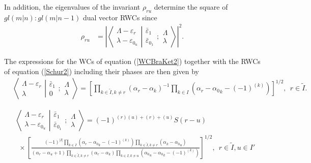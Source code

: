 \documentclass[12pt]{article}
\def\nn{\nonumber}
\begin{document}
In addition, the eigenvalues of the invariant ${\rho}_{ru}$ determine the square of $gl(m|n):gl(m|n-1)$ dual vector RWCs \cite{GIW2} since
\begin{align}
\rho_{ru} &= \left| \left\langle\left. 
\begin{array}{c} \Lambda-\varepsilon_r\\ \lambda-\varepsilon_{0_u} \end{array}
\right|\right.
\left.
\begin{array}{c} \bar{\varepsilon}_1 \\
\bar{\varepsilon}_{0_1}  \end{array}  ; \begin{array}{c} \Lambda \\
\lambda \end{array}
\right\rangle \nn \right|^2.
\end{align}

The expressions for the WCs of equation (\ref{WCBraKet2}) together with the RWCs of equation (\ref{Schur2}) including their phases \cite{GIW3} are then given by
\begin{align}
&\left\langle\left. 
\begin{array}{c} \Lambda-\varepsilon_r\\ \lambda
 \end{array}
\right|\right.
\left.
\begin{array}{c} \bar{\varepsilon}_1 \\ 0 
 \end{array}
; \begin{array}{c} \Lambda \\ \lambda
 \end{array}
\right\rangle
= \left[ \prod_{k\in \tilde{I},k\neq r} \left(\alpha_r - \alpha_k \right)^{-1}\prod_{k\in
I} \left(\alpha_r - {\alpha_0}_k - (-1)^{(k)}\right) \right]^{1/2}
,\ \ r\in \tilde{I} .
\end{align}

\begin{align}
&\left\langle\left. 
\begin{array}{c} \Lambda-\varepsilon_r\\ \lambda-\varepsilon_{0_u} 
 \end{array}
\right|\right.
\left.
\begin{array}{c} \bar{\varepsilon}_1 \\ \bar{\varepsilon}_{0_1} 
 \end{array}
; \begin{array}{c} \Lambda \\ \lambda
 \end{array}
\right\rangle
= (-1)^{(r)(u) +(r) + (u)} S(r-u)
\nn \\
&~~\times
\left[
\frac{
(-1)^{|I|}
\prod_{k\in I} \left(\alpha_r - {\alpha_0}_k - (-1)^{(k)}\right)
\prod_{k\in\tilde{I},k \neq r} \left(\alpha_k - {\alpha_0}_u \right)
}
{
({\alpha}_r-{\alpha}_u + 1)
\prod_{k\in \tilde{I},k\neq r} \left(\alpha_r - \alpha_k \right)
\prod_{k\in I,k\neq u} \left({\alpha_0}_u - {\alpha_0}_k - (-1)^{(k)}\right)
} 
\right]^{1/2}
,\ \ r\in \tilde{I},u\in I' \label{FinalUnBarredEven}
\end{align}
\end{document}
